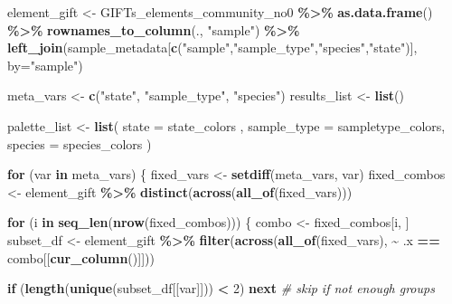 \documentclass[
]{book}
\newenvironment{Shaded}{\begin{snugshade}}{\end{snugshade}}
\newcommand{\AttributeTok}[1]{\textcolor[rgb]{0.13,0.29,0.53}{#1}}
\newcommand{\CommentTok}[1]{\textcolor[rgb]{0.56,0.35,0.01}{\textit{#1}}}
\newcommand{\ControlFlowTok}[1]{\textcolor[rgb]{0.13,0.29,0.53}{\textbf{#1}}}
\newcommand{\DecValTok}[1]{\textcolor[rgb]{0.00,0.00,0.81}{#1}}
\newcommand{\FunctionTok}[1]{\textcolor[rgb]{0.13,0.29,0.53}{\textbf{#1}}}
\newcommand{\NormalTok}[1]{#1}
\newcommand{\OtherTok}[1]{\textcolor[rgb]{0.56,0.35,0.01}{#1}}
\newcommand{\SpecialCharTok}[1]{\textcolor[rgb]{0.81,0.36,0.00}{\textbf{#1}}}
\newcommand{\StringTok}[1]{\textcolor[rgb]{0.31,0.60,0.02}{#1}}
\begin{document}
\begin{Shaded}
\begin{Highlighting}[]
\NormalTok{element\_gift }\OtherTok{\textless{}{-}}\NormalTok{ GIFTs\_elements\_community\_no0 }\SpecialCharTok{\%\textgreater{}\%} 
  \FunctionTok{as.data.frame}\NormalTok{() }\SpecialCharTok{\%\textgreater{}\%} 
  \FunctionTok{rownames\_to\_column}\NormalTok{(., }\StringTok{"sample"}\NormalTok{) }\SpecialCharTok{\%\textgreater{}\%} 
  \FunctionTok{left\_join}\NormalTok{(sample\_metadata[}\FunctionTok{c}\NormalTok{(}\StringTok{"sample"}\NormalTok{,}\StringTok{"sample\_type"}\NormalTok{,}\StringTok{"species"}\NormalTok{,}\StringTok{"state"}\NormalTok{)], }\AttributeTok{by=}\StringTok{"sample"}\NormalTok{)}

\NormalTok{meta\_vars }\OtherTok{\textless{}{-}} \FunctionTok{c}\NormalTok{(}\StringTok{"state"}\NormalTok{, }\StringTok{"sample\_type"}\NormalTok{, }\StringTok{"species"}\NormalTok{)}
\NormalTok{results\_list }\OtherTok{\textless{}{-}} \FunctionTok{list}\NormalTok{()}

\NormalTok{palette\_list }\OtherTok{\textless{}{-}} \FunctionTok{list}\NormalTok{(}
  \AttributeTok{state =}\NormalTok{ state\_colors ,}
  \AttributeTok{sample\_type =}\NormalTok{ sampletype\_colors,}
  \AttributeTok{species =}\NormalTok{ species\_colors}
\NormalTok{)}

\ControlFlowTok{for}\NormalTok{ (var }\ControlFlowTok{in}\NormalTok{ meta\_vars) \{}
\NormalTok{  fixed\_vars }\OtherTok{\textless{}{-}} \FunctionTok{setdiff}\NormalTok{(meta\_vars, var)}
\NormalTok{  fixed\_combos }\OtherTok{\textless{}{-}}\NormalTok{ element\_gift }\SpecialCharTok{\%\textgreater{}\%}
    \FunctionTok{distinct}\NormalTok{(}\FunctionTok{across}\NormalTok{(}\FunctionTok{all\_of}\NormalTok{(fixed\_vars)))}
  
  \ControlFlowTok{for}\NormalTok{ (i }\ControlFlowTok{in} \FunctionTok{seq\_len}\NormalTok{(}\FunctionTok{nrow}\NormalTok{(fixed\_combos))) \{}
\NormalTok{    combo }\OtherTok{\textless{}{-}}\NormalTok{ fixed\_combos[i, ]}
\NormalTok{    subset\_df }\OtherTok{\textless{}{-}}\NormalTok{ element\_gift }\SpecialCharTok{\%\textgreater{}\%}
      \FunctionTok{filter}\NormalTok{(}\FunctionTok{across}\NormalTok{(}\FunctionTok{all\_of}\NormalTok{(fixed\_vars), }\SpecialCharTok{\textasciitilde{}}\NormalTok{ .x }\SpecialCharTok{==}\NormalTok{ combo[[}\FunctionTok{cur\_column}\NormalTok{()]]))}
    
    \ControlFlowTok{if}\NormalTok{ (}\FunctionTok{length}\NormalTok{(}\FunctionTok{unique}\NormalTok{(subset\_df[[var]])) }\SpecialCharTok{\textless{}} \DecValTok{2}\NormalTok{) }\ControlFlowTok{next}  \CommentTok{\# skip if not enough groups}
    

\end{Highlighting}
\end{Shaded}
\end{document}
